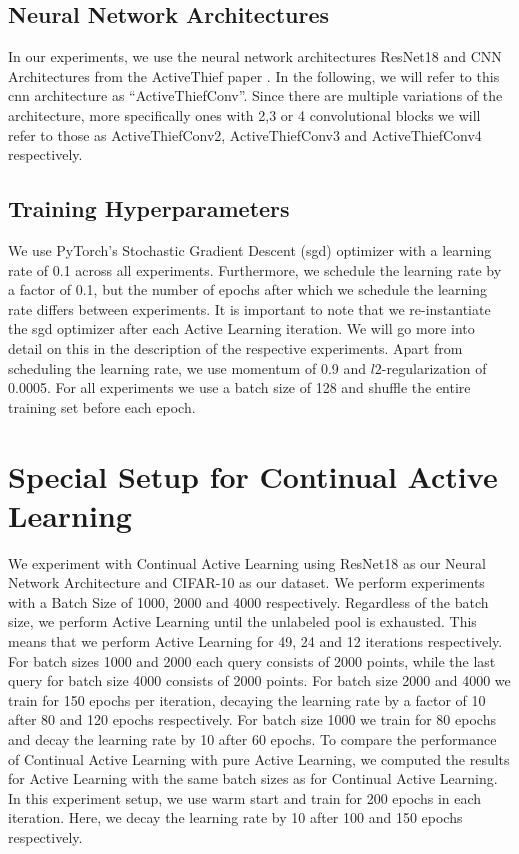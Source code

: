 \subsection{Neural Network Architectures}
\label{sec:ExperimentSetup:NNArchitectures}
In our experiments, we use the neural network architectures ResNet18 \cite{he2016deep} and CNN Architectures from the ActiveThief paper \cite{pal2020activethief}.
In the following, we will refer to this \gls{cnn} architecture as \enquote{ActiveThiefConv}. Since there are multiple variations of the architecture, more specifically ones with
2,3 or 4 convolutional blocks we will refer to those as ActiveThiefConv2, ActiveThiefConv3 and ActiveThiefConv4 respectively.


\subsection{Training Hyperparameters}
\label{sec:ExperimentSetup:Hyperparameters}
We use PyTorch's Stochastic Gradient Descent (\gls{sgd}) optimizer with a learning rate of 0.1 across all experiments. Furthermore, we schedule the learning rate by a factor of 0.1, but the number of
epochs after which we schedule the learning rate differs between experiments. It is important to note that we re-instantiate the \gls{sgd} optimizer after each Active Learning
iteration. We will go more into detail on this in the description of the respective experiments. Apart from scheduling the learning rate, we use momentum \cite{cutkosky2020momentum}
of 0.9 and $l2$-regularization of 0.0005. For all experiments we use a batch size of 128 and shuffle the entire training set before each epoch.


\section{Special Setup for Continual Active Learning}
\label{sec:Methodology:CALsetup}
We experiment with Continual Active Learning using ResNet18 as our Neural Network Architecture and CIFAR-10 as our dataset. We perform experiments with a Batch Size of 1000,
2000 and 4000 respectively. Regardless of the batch size, we perform Active Learning until the unlabeled pool is exhausted. This means that we perform Active Learning for
49, 24 and 12 iterations respectively. For batch sizes 1000 and 2000 each query consists of 2000 points, while the last query for batch size 4000 consists of 2000 points.
For batch size 2000 and 4000 we train for 150 epochs per iteration, decaying the learning rate by a factor of 10 after 80 and 120 epochs respectively. For batch size 1000 we
train for 80 epochs and decay the learning rate by 10 after 60 epochs. To compare the performance of Continual Active Learning with pure Active Learning, we computed the results
for Active Learning with the same batch sizes as for Continual Active Learning. In this experiment setup, we use warm start and train for 200 epochs in each iteration. Here, we
decay the learning rate by 10 after 100 and 150 epochs respectively.

